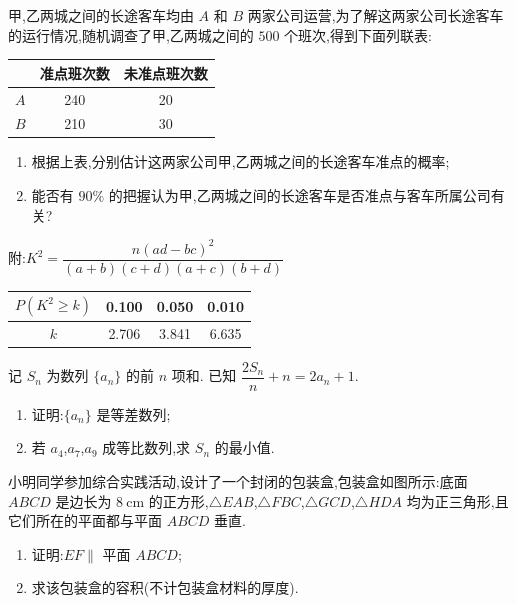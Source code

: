 \begin{problem}
甲,乙两城之间的长途客车均由 \(A\) 和 \(B\) 两家公司运营,为了解这两家公司长途客车的运行情况,随机调查了甲,乙两城之间的 \(500\) 个班次,得到下面列联表:

\begin{center}
\begin{tabular}{c c c}
\hline
& 准点班次数 & 未准点班次数 \\
\hline
\(A\) & 240 & 20 \\
\(B\) & 210 & 30 \\
\hline
\end{tabular}
\end{center}

\begin{enumerate}
\item 根据上表,分别估计这两家公司甲,乙两城之间的长途客车准点的概率;
\item 能否有 \(90\%\) 的把握认为甲,乙两城之间的长途客车是否准点与客车所属公司有关?
\end{enumerate}

附:\(K^2=\dfrac{n\left(ad-bc\right)^2}{\left(a+b\right)\left(c+d\right)\left(a+c\right)\left(b+d\right)}\)

\begin{center}
\begin{tabular}{c c c c}
\hline
\(P\left(K^2\ge k\right)\) & 0.100 & 0.050 & 0.010 \\
\hline
\(k\) & 2.706 & 3.841 & 6.635 \\
\hline
\end{tabular}
\end{center}
\end{problem}

\begin{problem}
记 \(S_n\) 为数列 \(\{a_n\}\) 的前 \(n\) 项和. 已知 \(\dfrac{2S_n}{n}+n=2a_n+1\).

\begin{enumerate}
\item 证明:\(\{a_n\}\) 是等差数列;
\item 若 \(a_4\),\(a_7\),\(a_9\) 成等比数列,求 \(S_n\) 的最小值.
\end{enumerate}
\end{problem}

\begin{problem}
小明同学参加综合实践活动,设计了一个封闭的包装盒,包装盒如图所示:底面 \(ABCD\) 是边长为 \(8\mathrm{~cm}\) 的正方形,\(\triangle EAB\),\(\triangle FBC\),\(\triangle GCD\),\(\triangle HDA\) 均为正三角形,且它们所在的平面都与平面 \(ABCD\) 垂直.

\begin{enumerate}
\item 证明:\(EF\parallel\) 平面 \(ABCD\);
\item 求该包装盒的容积(不计包装盒材料的厚度).
\end{enumerate}

\end{problem}

